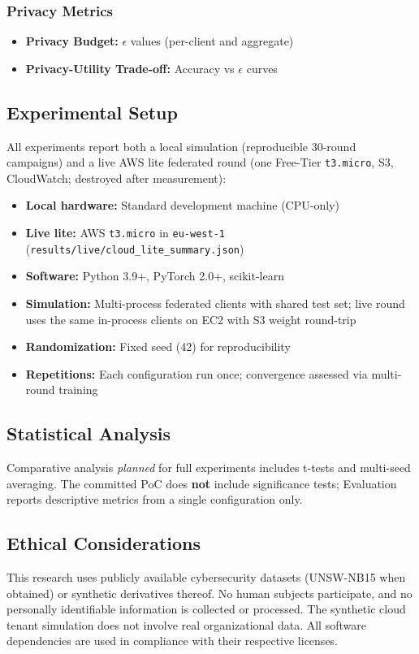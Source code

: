\subsubsection{Privacy Metrics}

\begin{itemize}
    \item \textbf{Privacy Budget:} $\epsilon$ values (per-client and aggregate)
    \item \textbf{Privacy-Utility Trade-off:} Accuracy vs $\epsilon$ curves
\end{itemize}

\subsection{Experimental Setup}

All experiments report both a local simulation (reproducible 30-round campaigns) and a live AWS lite federated round (one Free-Tier \texttt{t3.micro}, S3, CloudWatch; destroyed after measurement):

\begin{itemize}
    \item \textbf{Local hardware:} Standard development machine (CPU-only)
    \item \textbf{Live lite:} AWS \texttt{t3.micro} in \texttt{eu-west-1} (\texttt{results/live/cloud\_lite\_summary.json})
    \item \textbf{Software:} Python 3.9+, PyTorch 2.0+, scikit-learn
    \item \textbf{Simulation:} Multi-process federated clients with shared test set; live round uses the same in-process clients on EC2 with S3 weight round-trip
    \item \textbf{Randomization:} Fixed seed (42) for reproducibility
    \item \textbf{Repetitions:} Each configuration run once; convergence assessed via multi-round training
\end{itemize}

\subsection{Statistical Analysis}

Comparative analysis \emph{planned} for full experiments includes t-tests and multi-seed averaging. The committed PoC does \textbf{not} include significance tests; Evaluation reports descriptive metrics from a single configuration only.

\subsection{Ethical Considerations}

This research uses publicly available cybersecurity datasets (UNSW-NB15 when obtained) or synthetic derivatives thereof. No human subjects participate, and no personally identifiable information is collected or processed. The synthetic cloud tenant simulation does not involve real organizational data. All software dependencies are used in compliance with their respective licenses.
